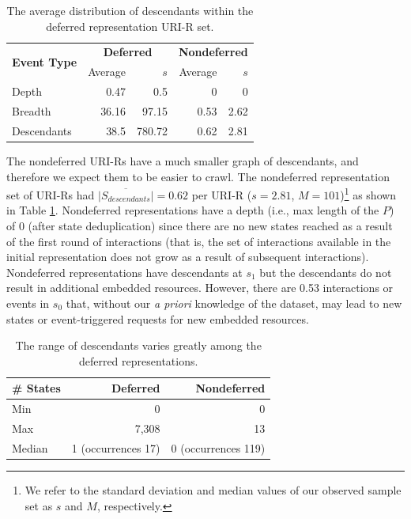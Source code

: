 \documentclass{sig-alternate}
\begin{document}
\begin{table}
\centering
\begin{tabular}{ l | r | r | r | r }
\multirow{2}{*}{\textbf{Event Type}} & \multicolumn{2}{c}{\textbf{Deferred}} & \multicolumn{2}{c}{\textbf{Nondeferred}} \\
                            & Average         & $s$         & Average   &     $s$    \\
\hline
\hline
Depth & 0.47  & 0.5 & 0 & 0 \\
\hline
Breadth & 36.16  & 97.15 & 0.53 & 2.62 \\
\hline
Descendants & 38.5  & 780.72 & 0.62 & 2.81 \\
\hline
\end{tabular}
  \caption{The average distribution of descendants within the deferred representation URI-R set.}
  \label{depthvbreadth}
\end{table}



The nondeferred URI-Rs have a much smaller graph of descendants, and therefore we expect them to be easier to crawl. The nondeferred representation set of URI-Rs had $\overline{|S_{descendants}|}=0.62$ per URI-R ($s=2.81$, $M=101$)\footnote{We refer to the standard deviation and median values of our observed sample set as $s$ and $M$, respectively.} as shown in Table \ref{depthvbreadth}. Nondeferred representations have a depth (i.e., max length of the $P$) of 0 (after state deduplication) since there are no new states reached as a result of the first round of interactions (that is, the set of interactions available in the initial representation does not grow as a result of subsequent interactions). Nondeferred representations have descendants at $s_1$ but the descendants do not result in additional embedded resources. However, there are 0.53 interactions or events in $s_0$ that, without our \emph{a priori} knowledge of the dataset, may lead to new states or event-triggered requests for new embedded resources.

\begin{table}
\centering
\begin{tabular}{ l | r | r }
\textbf{\# States} & \textbf{Deferred} & \textbf{Nondeferred} \\
\hline
\hline
Min & 0 & 0\\
\hline
Max & 7,308 & 13\\
\hline
Median & 1 (occurrences 17) & 0 (occurrences 119)\\
\hline
\end{tabular}
  \caption{The range of descendants varies greatly among the deferred representations.}
  \label{stateminmedmod}
\end{table}
\end{document}
